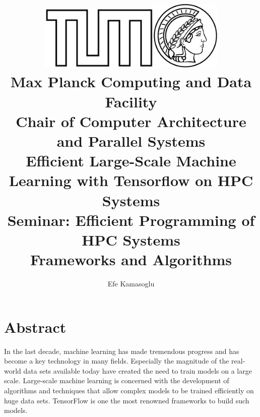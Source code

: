 \documentclass[ieeetran]{article}
\title{\includegraphics[width=0.43\textwidth]{tumlogo}\hspace{2ex}\includegraphics[width=0.25\textwidth]{maxlogo}\vspace{1ex}\\ \large \textbf{Max Planck Computing and Data Facility \\Chair of Computer Architecture and Parallel Systems} \vspace{10ex}\\ \huge Efficient Large-Scale Machine Learning with Tensorflow on HPC Systems \vspace{6ex}\\
\large Seminar: Efficient Programming of HPC Systems \\Frameworks and Algorithms\vspace{15ex}}
\author{Efe Kamasoglu}
\begin{document}
\maketitle

\pagebreak

\tableofcontents

\pagebreak


\section*{Abstract}
In the last decade, machine learning has made tremendous progress and has become a key technology in many fields. Especially the magnitude of the real-world data sets available today have created the need to train models on a large scale. Large-scale machine learning is concerned with the development of algorithms and techniques that allow complex models to be trained efficiently on huge data sets. TensorFlow is one the most renowned frameworks to build such models. 



\pagebreak
\end{document}
